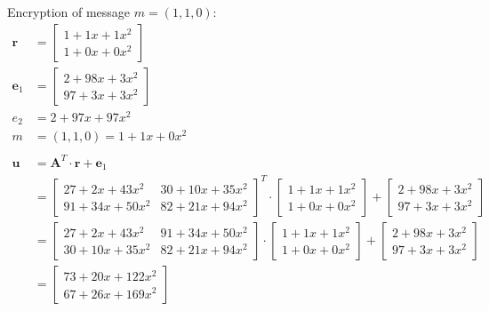 Encryption of message $m=(1,1,0)$:
\begin{align*}
  \textbf{r}            & = \begin{bmatrix}1+1x+1x^2 \\ 1+0x+0x^2 \end{bmatrix}                                       \\
  \textbf{e}_1 & = \begin{bmatrix}2+98x+3x^2 \\ 97+3x+3x^2 \end{bmatrix}                                     \\
  e_2          & = 2+97x+97x^2                                                                               \\
  m            & =(1,1,0) = 1+1x+0x^2                                                                       \\
  \\
  \textbf{u}            & = \textbf{A}^T \cdot \textbf{r} + \textbf{e}_1                                                       \\
               & = \begin{bmatrix}27+2x+43x^2 & 30+10x+35x^2 \\ 91+34x+50x^2 & 82+21x+94x^2 \end{bmatrix}^T
  \cdot
  \begin{bmatrix}1+1x+1x^2 \\ 1+0x+0x^2 \end{bmatrix}
  +
  \begin{bmatrix}2+98x+3x^2 \\ 97+3x+3x^2 \end{bmatrix}                                                      \\
               & = \begin{bmatrix}27+2x+43x^2 & 91+34x+50x^2 \\ 30+10x+35x^2  & 82+21x+94x^2 \end{bmatrix}
  \cdot
  \begin{bmatrix}1+1x+1x^2 \\ 1+0x+0x^2 \end{bmatrix}
  +
  \begin{bmatrix}2+98x+3x^2 \\ 97+3x+3x^2 \end{bmatrix}                                                      \\
               & = \begin{bmatrix}73+20x+122x^2 \\ 67+26x+169x^2 \end{bmatrix}

\end{align*}
